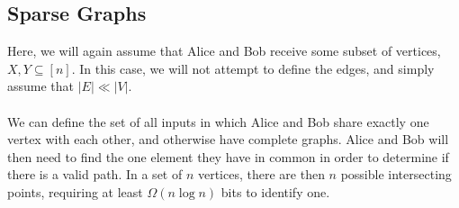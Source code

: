 \documentclass{article}
\begin{document}
\subsection{Sparse Graphs}
Here, we will again assume that Alice and Bob receive some subset of vertices,
$X, Y \subseteq [n]$. In this case, we will not attempt to define the edges,
and simply assume that $|E| \ll |V|$.
\\\\
We can define the set of all inputs in which Alice and Bob share exactly one
vertex with each other, and otherwise have complete graphs. Alice and Bob will
then need to find the one element they have in common in order to determine if
there is a valid path. In a set of $n$ vertices, there are then $n$ possible
intersecting points, requiring at least $\Omega(n \log n)$ bits to identify one.
\end{document}
